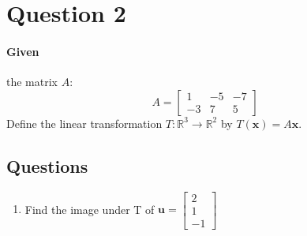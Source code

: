 \documentclass{article}
\begin{document}
    \section{Question 2}
        \paragraph{Given}
            the matrix $A$:
            $$
                A = \begin{bmatrix} 1 & -5 & -7 \\ -3 & 7 & 5 \end{bmatrix}
            $$
            Define the linear transformation $T: \mathbb{R}^3 \rightarrow \mathbb{R}^2$ by $T(\mathbf{x}) = A\mathbf{x}$.
        \subsection{Questions}
            \begin{enumerate}[label=(\alph*)]
                \item Find the image under T of $\mathbf{u}=\begin{bmatrix}2\\1\\-1\end{bmatrix}$
            \end{enumerate}
 
\end{document}

